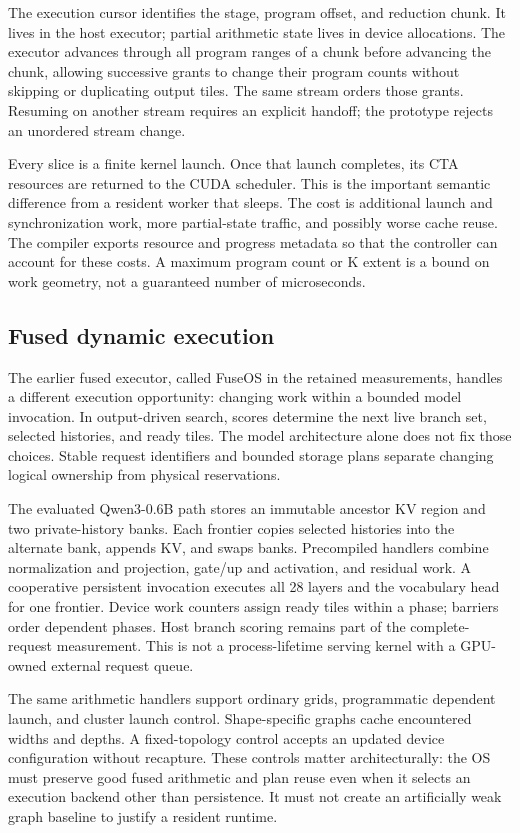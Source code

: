 The execution cursor identifies the stage, program offset, and reduction
chunk. It lives in the host executor; partial arithmetic state lives in
device allocations. The executor advances through all program ranges of a
chunk before advancing the chunk, allowing successive grants to change
their program counts without skipping or duplicating output tiles. The
same stream orders those grants. Resuming on another stream requires an
explicit handoff; the prototype rejects an unordered stream change.

Every slice is a finite kernel launch. Once that launch completes, its CTA
resources are returned to the CUDA scheduler. This is the important semantic
difference from a resident worker that sleeps. The cost is additional launch
and synchronization work, more partial-state traffic, and possibly worse
cache reuse. The compiler exports resource and progress metadata so that the
controller can account for these costs. A maximum program count or K extent
is a bound on work geometry, not a guaranteed number of microseconds.

\subsection{Fused dynamic execution}
The earlier fused executor, called FuseOS in the retained measurements,
handles a different execution opportunity: changing work within a bounded
model invocation. In output-driven search, scores determine the next live
branch set, selected histories, and ready tiles. The model architecture alone
does not fix those choices. Stable request identifiers and bounded storage
plans separate changing logical ownership from physical reservations.

The evaluated Qwen3-0.6B path stores an immutable ancestor KV region and two
private-history banks. Each frontier copies selected histories into the
alternate bank, appends KV, and swaps banks. Precompiled handlers combine
normalization and projection, gate/up and activation, and residual work.
A cooperative persistent invocation executes all 28 layers and the vocabulary
head for one frontier. Device work counters assign ready tiles within a
phase; barriers order dependent phases. Host branch scoring remains part of
the complete-request measurement. This is not a process-lifetime serving
kernel with a GPU-owned external request queue.

The same arithmetic handlers support ordinary grids, programmatic dependent
launch, and cluster launch control. Shape-specific graphs cache encountered
widths and depths. A fixed-topology control accepts an updated device
configuration without recapture. These controls matter architecturally:
the OS must preserve good fused arithmetic and plan reuse even when it
selects an execution backend other than persistence. It must not create an
artificially weak graph baseline to justify a resident runtime.

